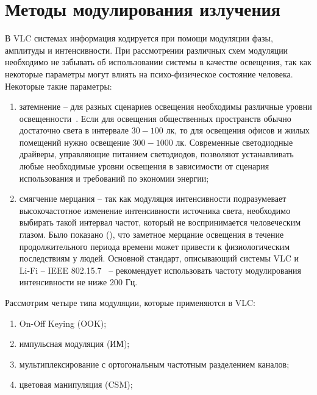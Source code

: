 \chapter{Методы модулирования излучения}

В VLC системах информация кодируется при помощи модуляции фазы, амплитуды и интенсивности. При рассмотрении различных схем модуляции необходимо не забывать об использовании системы в качестве освещения, так как некоторые параметры могут влиять на психо-физическое состояние человека. Некоторые такие параметры:

\begin{enumerate}
    \item затемнение \--- для разных сценариев освещения необходимы различные уровни освещенности~\cite{Zukauskas2002}. Если для освещения общественных пространств обычно достаточно света в интервале $30-100$ лк, то для освещения офисов и жилых помещений нужно освещение $300-1000$ лк. Современные светодиодные драйверы, управляющие питанием светодиодов, позволяют устанавливать любые необходимые уровни освещения в зависимости от сценария использования и требований по экономии энергии;
    \item смягчение мерцания \--- так как модуляция интенсивности подразумевает высокочастотное изменение интенсивности источника света, необходимо выбирать такой интервал частот, который не воспринимается человеческим глазом. Было показано (\cite{Berman1991}), что заметное мерцание освещения в течение продолжительного периода времени может привести к физиологическим последствиям у людей. Основной стандарт, описывающий системы VLC и Li-Fi \--- IEEE 802.15.7~\cite{IEEE2018} \--- рекомендует использовать частоту модулирования интенсивности не ниже 200 Гц.
\end{enumerate}

Рассмотрим четыре типа модуляции, которые применяются в VLC: 


\begin{enumerate}
    \item On-Off Keying (OOK);
    \item импульсная модуляция (ИМ);
    \item мультиплексирование с ортогональным частотным разделением каналов;
    \item цветовая манипуляция (CSM);
\end{enumerate}

